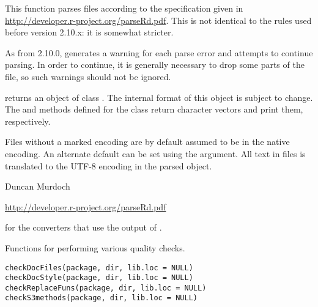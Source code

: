 %
\begin{Details}\relax
This function parses  files according to the specification given
in \url{http://developer.r-project.org/parseRd.pdf}.  This is not
identical to the rules used before version 2.10.x: it is somewhat
stricter.

As from \R{} 2.10.0,  generates a warning for each parse
error and attempts to continue parsing.  In order to continue, it is
generally necessary to drop some parts of the file, so such warnings
should not be ignored.
\end{Details}
%
\begin{Value}
 returns an object of class .  The
internal format of this object is subject to change.  The
 and  methods defined for the
class return character vectors and print them, respectively.

Files without a marked encoding are by default assumed to be in the
native encoding.  An alternate default can be set using the
 argument.  All text in files is translated to the
UTF-8 encoding in the parsed object.
\end{Value}
%
\begin{Author}\relax
 Duncan Murdoch 
\end{Author}
%
\begin{References}\relax
 \url{http://developer.r-project.org/parseRd.pdf} 
\end{References}
%
\begin{SeeAlso}\relax
{} for the converters that use the output of
.
\end{SeeAlso}
%
\begin{Description}\relax
Functions for performing various quality checks.
\end{Description}
%
\begin{Usage}
\begin{verbatim}
checkDocFiles(package, dir, lib.loc = NULL)
checkDocStyle(package, dir, lib.loc = NULL)
checkReplaceFuns(package, dir, lib.loc = NULL)
checkS3methods(package, dir, lib.loc = NULL)
\end{verbatim}
\end{Usage}
